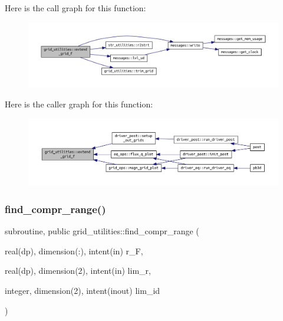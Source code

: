 Here is the call graph for this function\+:
\nopagebreak
\begin{figure}[H]
\begin{center}
\leavevmode
\includegraphics[width=350pt]{namespacegrid__utilities_a414a1a11924bc935afca3a89fc31f2f5_cgraph}
\end{center}
\end{figure}
Here is the caller graph for this function\+:
\nopagebreak
\begin{figure}[H]
\begin{center}
\leavevmode
\includegraphics[width=350pt]{namespacegrid__utilities_a414a1a11924bc935afca3a89fc31f2f5_icgraph}
\end{center}
\end{figure}
\mbox{\label{namespacegrid__utilities_ae08e1ff213071c9d411a9b9c76035e1e}} 
\subsubsection{\texorpdfstring{find\+\_\+compr\+\_\+range()}{find\_compr\_range()}}
{\footnotesize\ttfamily subroutine, public grid\+\_\+utilities\+::find\+\_\+compr\+\_\+range (\begin{DoxyParamCaption}\item[{real(dp), dimension(\+:), intent(in)}]{r\+\_\+F,  }\item[{real(dp), dimension(2), intent(in)}]{lim\+\_\+r,  }\item[{integer, dimension(2), intent(inout)}]{lim\+\_\+id }\end{DoxyParamCaption})}



